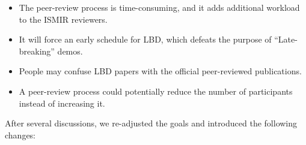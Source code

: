 \documentclass[%
10pt,								%
titlepage,						%
]
{scrartcl}
\begin{document}
            \begin{itemize}
                \item   The peer-review process is time-consuming, and it adds additional workload to the ISMIR reviewers.
                \item   It will force an early schedule for LBD, which defeats the purpose of ``Late-breaking'' demos. 
                \item   People may confuse LBD papers with the official peer-reviewed publications.
                \item   A peer-review process could potentially reduce the number of participants instead of increasing it.
            \end{itemize}
            
            After several discussions, we re-adjusted the goals and introduced the following changes:
\end{document}
